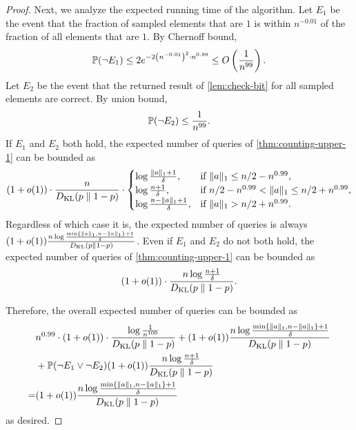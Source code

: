 \begin{proof}
Next, we analyze the expected running time of the algorithm. Let $E_1$ be the event that the fraction of sampled elements that are $1$ is within $n^{-0.01}$ of the fraction of all elements that are $1$. By Chernoff bound,
\[
\mathbb{P}(\neg E_1) \le 2 e^{-2 \left(n^{-0.01} \right)^2 \cdot n^{0.99}} \le O\left(\frac{1}{n^{99}}\right).
\]
Let $E_2$ be the event that the returned result of \cref{lem:check-bit} for all sampled elements are correct. By union bound,
\[
\mathbb{P}(\neg E_2) \le \frac{1}{n^{99}}.
\]
If $E_1$ and $E_2$ both hold, the expected number of queries of \cref{thm:counting-upper-1} can be bounded as
\[
(1+o(1)) \cdot \frac{n}{D_{\operatorname{\mathrm{KL}}}(p \parallel 1-p)} \cdot
\begin{cases}
   \log \frac{\lVert a \rVert_1 + 1}{\delta},  & \text{if } \lVert a\rVert_1 \le n / 2 - n^{0.99},\\
   \log \frac{n + 1}{\delta},  & \text{if } n / 2 - n^{0.99} < \lVert a\rVert_1 \le n / 2 + n^{0.99},\\
   \log \frac{n - \lVert a \rVert_1 + 1}{\delta},  & \text{if } \lVert a\rVert_1 > n / 2 + n^{0.99}.
\end{cases}
\]
Regardless of which case it is, the expected number of queries is always $(1+o(1))\frac{n \log \frac{\min\{\lVert a \rVert_1, n - \lVert a \rVert_1\} + 1}{\delta}}{D_{\operatorname{\mathrm{KL}}}(p \parallel 1-p)}$. Even if $E_1$ and $E_2$ do not both hold, the expected number of queries of \cref{thm:counting-upper-1} can be bounded as
\[
(1+o(1)) \cdot \frac{n \log \frac{n + 1}{\delta}}{D_{\operatorname{\mathrm{KL}}}(p \parallel 1-p)}.
\]

Therefore, the overall expected number of queries can be bounded as
\begin{align*}
& n^{0.99} \cdot (1+o(1)) \cdot \frac{\log \frac{1}{n^{100}}}{D_{\operatorname{\mathrm{KL}}}(p \parallel 1-p)} + (1+o(1))\frac{n \log \frac{\min\{\lVert a \rVert_1, n - \lVert a \rVert_1\} + 1}{\delta}}{D_{\operatorname{\mathrm{KL}}}(p \parallel 1-p)} \\
& + \mathbb{P}(\neg E_1 \vee \neg E_2) (1+o(1))\frac{n \log \frac{n + 1}{\delta}}{D_{\operatorname{\mathrm{KL}}}(p \parallel 1-p)}\\
= & (1+o(1))\frac{n \log \frac{\min\{\lVert a \rVert_1, n - \lVert a \rVert_1\} + 1}{\delta}}{D_{\operatorname{\mathrm{KL}}}(p \parallel 1-p)}
\end{align*}
as desired.
\end{proof}
